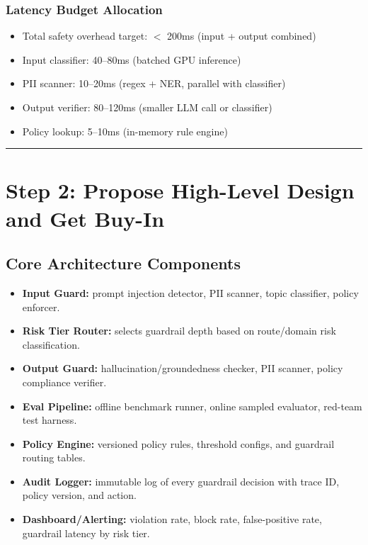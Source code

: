 \subsubsection*{Latency Budget Allocation}

\begin{itemize}
  \item Total safety overhead target: $<$ 200ms (input + output combined)
  \item Input classifier: 40--80ms (batched GPU inference)
  \item PII scanner: 10--20ms (regex + NER, parallel with classifier)
  \item Output verifier: 80--120ms (smaller LLM call or classifier)
  \item Policy lookup: 5--10ms (in-memory rule engine)
\end{itemize}

\bigskip\hrule\bigskip

\section*{Step 2: Propose High-Level Design and Get Buy-In}

\subsection*{Core Architecture Components}

\begin{itemize}
  \item \textbf{Input Guard:} prompt injection detector, PII scanner, topic classifier, policy enforcer.
  \item \textbf{Risk Tier Router:} selects guardrail depth based on route/domain risk classification.
  \item \textbf{Output Guard:} hallucination/groundedness checker, PII scanner, policy compliance verifier.
  \item \textbf{Eval Pipeline:} offline benchmark runner, online sampled evaluator, red-team test harness.
  \item \textbf{Policy Engine:} versioned policy rules, threshold configs, and guardrail routing tables.
  \item \textbf{Audit Logger:} immutable log of every guardrail decision with trace ID, policy version, and action.
  \item \textbf{Dashboard/Alerting:} violation rate, block rate, false-positive rate, guardrail latency by risk tier.
\end{itemize}


